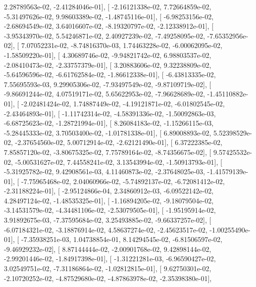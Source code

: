 \documentclass{article}
\begin{document}
          2.28789563e-02,  -2.41284046e-01],
       [ -2.16121338e-02,   7.72664859e-02,  -5.31497626e-02,
          9.98603389e-02,  -1.48745116e-01],
       [ -6.98253156e-02,  -2.68694549e-02,   3.64016607e-02,
         -8.19320797e-02,  -2.12338912e-01],
       [ -3.95343970e-02,   5.54246871e-02,   2.40927239e-02,
         -7.49258095e-02,  -7.65352956e-02],
       [  7.07052231e-02,  -8.74816370e-03,   1.74463228e-02,
         -6.00062095e-02,  -1.58509220e-01],
       [  4.30689746e-02,  -9.94821742e-02,   6.98803537e-02,
         -2.08410473e-02,  -2.33757379e-01],
       [  3.20883606e-02,   9.32238809e-02,  -5.64596596e-02,
         -6.61762584e-02,  -1.86612338e-01],
       [ -6.43813335e-02,   7.55695593e-03,   9.29905306e-02,
         -7.93497549e-02,  -9.87109719e-02],
       [ -9.86691244e-02,   4.07519171e-02,   5.65622953e-02,
         -7.96628689e-02,  -1.45110882e-01],
       [ -2.02481424e-02,   1.74887449e-02,  -4.19121871e-02,
         -6.01802545e-02,  -2.43464893e-01],
       [ -1.11742314e-02,  -4.58391336e-02,  -1.50092863e-03,
         -6.68725623e-02,  -1.28721994e-01],
       [  8.26084183e-02,  -1.15266115e-03,  -5.28445333e-02,
          3.70503400e-02,  -1.01781338e-01],
       [  6.89008893e-02,   5.52398529e-02,  -2.37654560e-02,
          5.00712914e-02,  -2.62121490e-01],
       [  6.37222385e-02,   7.85857120e-02,  -3.80675325e-02,
          7.75789164e-02,  -8.74356675e-02],
       [  9.57425532e-02,  -5.00531627e-02,   7.44558241e-02,
          3.13543994e-02,  -1.50913793e-01],
       [ -5.31925782e-02,   9.42908561e-03,   4.11460873e-02,
         -2.37648025e-03,  -1.41579139e-01],
       [ -7.75965468e-02,   2.04060966e-02,  -5.74892137e-02,
         -6.72081412e-02,  -2.31188224e-01],
       [ -2.95124866e-04,   2.34860912e-03,  -6.09522142e-02,
          4.28497124e-02,  -1.48535325e-01],
       [ -1.16894205e-02,  -9.18079504e-02,  -3.14531579e-02,
         -4.34481106e-02,  -2.53079505e-01],
       [ -1.95195914e-02,   3.91892675e-03,  -7.37595684e-02,
          3.25493885e-02,  -9.66337257e-02],
       [ -6.07184321e-02,  -3.18876914e-02,   4.58637274e-02,
         -2.45623517e-02,  -1.00255490e-01],
       [ -7.35938251e-03,   1.04738854e-01,   8.14294545e-02,
         -6.81506597e-02,  -9.46929232e-02],
       [  8.87144444e-02,  -2.00901768e-02,   9.42898144e-02,
         -2.99201446e-02,  -1.84917398e-01],
       [ -1.31221281e-03,  -6.96590427e-02,   3.02549751e-02,
         -7.31186864e-02,  -1.02812815e-01],
       [  9.62750301e-02,  -2.10720252e-02,  -4.87529680e-02,
         -4.87863978e-02,  -2.35398380e-01],
\end{document}
